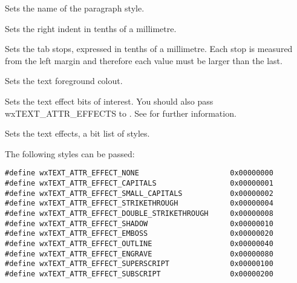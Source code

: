Sets the name of the paragraph style.

\label{wxtextattrsetrightindent}


Sets the right indent in tenths of a millimetre.

\label{wxtextattrsettabs}


Sets the tab stops, expressed in tenths of a millimetre.
Each stop is measured from the left margin and therefore each value must be larger than the last.

\label{wxtextattrsettextcolour}


Sets the text foreground colout.

\label{wxtextattrsettexteffectflags}


Sets the text effect bits of interest. You should also pass wxTEXT\_ATTR\_EFFECTS to .
See  for further information.

\label{wxtextattrsettexteffects}


Sets the text effects, a bit list of styles.

The following styles can be passed:

{\small
\begin{verbatim}
#define wxTEXT_ATTR_EFFECT_NONE                     0x00000000
#define wxTEXT_ATTR_EFFECT_CAPITALS                 0x00000001
#define wxTEXT_ATTR_EFFECT_SMALL_CAPITALS           0x00000002
#define wxTEXT_ATTR_EFFECT_STRIKETHROUGH            0x00000004
#define wxTEXT_ATTR_EFFECT_DOUBLE_STRIKETHROUGH     0x00000008
#define wxTEXT_ATTR_EFFECT_SHADOW                   0x00000010
#define wxTEXT_ATTR_EFFECT_EMBOSS                   0x00000020
#define wxTEXT_ATTR_EFFECT_OUTLINE                  0x00000040
#define wxTEXT_ATTR_EFFECT_ENGRAVE                  0x00000080
#define wxTEXT_ATTR_EFFECT_SUPERSCRIPT              0x00000100
#define wxTEXT_ATTR_EFFECT_SUBSCRIPT                0x00000200
\end{verbatim}
}

